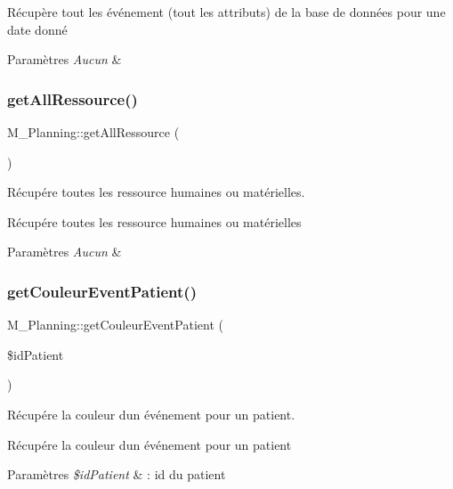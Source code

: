 Récupère tout les événement (tout les attributs) de la base de données pour une date donné 
\begin{DoxyParams}{Paramètres}
{\em Aucun} & \\
\hline
\end{DoxyParams}
\mbox{\label{class_m___planning_a058d0ecc4af6cfeadea6908cede9dcbb}} 
\subsubsection{\texorpdfstring{get\+All\+Ressource()}{getAllRessource()}}
{\footnotesize\ttfamily M\+\_\+\+Planning\+::get\+All\+Ressource (\begin{DoxyParamCaption}{ }\end{DoxyParamCaption})}



Récupére toutes les ressource humaines ou matérielles. 

Récupére toutes les ressource humaines ou matérielles 
\begin{DoxyParams}{Paramètres}
{\em Aucun} & \\
\hline
\end{DoxyParams}
\mbox{\label{class_m___planning_a0aac198824080f06e0b99c83c93536fa}} 
\subsubsection{\texorpdfstring{get\+Couleur\+Event\+Patient()}{getCouleurEventPatient()}}
{\footnotesize\ttfamily M\+\_\+\+Planning\+::get\+Couleur\+Event\+Patient (\begin{DoxyParamCaption}\item[{}]{\$id\+Patient }\end{DoxyParamCaption})}



Récupére la couleur d\textquotesingle{}un événement pour un patient. 

Récupére la couleur d\textquotesingle{}un événement pour un patient 
\begin{DoxyParams}{Paramètres}
{\em \$id\+Patient} & \+: id du patient \\
\hline
\end{DoxyParams}
\mbox{\label{class_m___planning_a9f56bfecc39a1dbc331dfdacb9557541}} 
